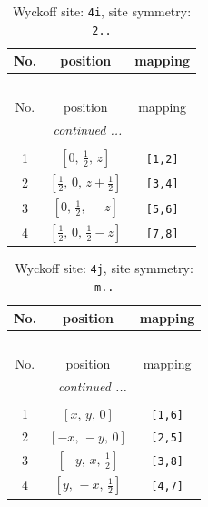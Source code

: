 \documentclass[fleqn,8pt]{jsarticle}
\begin{document}
\renewcommand{\arraystretch}{1.2}
\begin{longtable}{ccc}
\caption{Wyckoff site: {\tt 4i}, site symmetry: {\tt 2..}}
 \\
 \hline \hline
No. & position & mapping \\ \hline \endfirsthead

\multicolumn{2}{l}{\tablename\ \thetable{}} \\
 \hline \hline
No. & position & mapping \\ \hline \endhead

 \hline \hline
\multicolumn{2}{r}{\footnotesize\it continued ...} \\ \endfoot

 \hline \hline
\multicolumn{2}{r}{} \\ \endlastfoot

1 & $\left[ 0,\, \frac{1}{2},\, z \right]$ & {\tt [1,2]} \\ \hline
2 & $\left[ \frac{1}{2},\, 0,\, z + \frac{1}{2} \right]$ & {\tt [3,4]} \\ \hline
3 & $\left[ 0,\, \frac{1}{2},\, - z \right]$ & {\tt [5,6]} \\ \hline
4 & $\left[ \frac{1}{2},\, 0,\, \frac{1}{2} - z \right]$ & {\tt [7,8]} \\
\end{longtable}
\renewcommand{\arraystretch}{1.2}
\begin{longtable}{ccc}
\caption{Wyckoff site: {\tt 4j}, site symmetry: {\tt m..}}
 \\
 \hline \hline
No. & position & mapping \\ \hline \endfirsthead

\multicolumn{2}{l}{\tablename\ \thetable{}} \\
 \hline \hline
No. & position & mapping \\ \hline \endhead

 \hline \hline
\multicolumn{2}{r}{\footnotesize\it continued ...} \\ \endfoot

 \hline \hline
\multicolumn{2}{r}{} \\ \endlastfoot

1 & $\left[ x,\, y,\, 0 \right]$ & {\tt [1,6]} \\ \hline
2 & $\left[ - x,\, - y,\, 0 \right]$ & {\tt [2,5]} \\ \hline
3 & $\left[ - y,\, x,\, \frac{1}{2} \right]$ & {\tt [3,8]} \\ \hline
4 & $\left[ y,\, - x,\, \frac{1}{2} \right]$ & {\tt [4,7]} \\
\end{longtable}
\end{document}
